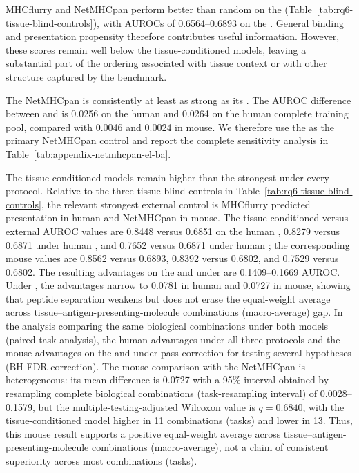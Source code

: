 MHCflurry and NetMHCpan perform better than random on the \plainMatchedPairs{} (Table~\ref{tab:rq6-tissue-blind-controls}), with AUROCs of 0.6564--0.6893 on the \plainFixedTest{}. General binding and presentation propensity therefore contributes useful information. However, these scores remain well below the tissue-conditioned models, leaving a substantial part of the ordering associated with tissue context or with other structure captured by the benchmark.

The NetMHCpan \plainEL{} is consistently at least as strong as its \plainBA{}. The AUROC difference between \plainEL{} and \plainBA{} is 0.0256 on the human \plainFixedTest{} and 0.0264 on the human complete training pool, compared with 0.0046 and 0.0024 in mouse. We therefore use the \plainEL{} as the primary NetMHCpan control and report the complete \plainBA{} sensitivity analysis in Table~\ref{tab:appendix-netmhcpan-el-ba}.

The tissue-conditioned models remain higher than the strongest \plainGeneralPMHC{} under every protocol. Relative to the three tissue-blind controls in Table~\ref{tab:rq6-tissue-blind-controls}, the relevant strongest external control is MHCflurry predicted presentation in human and NetMHCpan \plainEL{} in mouse. The tissue-conditioned-versus-external AUROC values are 0.8448 versus 0.6851 on the human \plainFixedTest{}, 0.8279 versus 0.6871 under human \plainMatchedOOF{}, and 0.7652 versus 0.6871 under human \plainPeptideOOF{}; the corresponding mouse values are 0.8562 versus 0.6893, 0.8392 versus 0.6802, and 0.7529 versus 0.6802. The resulting advantages on the \plainFixedTest{} and under \plainMatchedOOF{} are 0.1409--0.1669 AUROC. Under \plainPeptideOOF{}, the advantages narrow to 0.0781 in human and 0.0727 in mouse, showing that peptide separation weakens but does not erase the equal-weight average across tissue--antigen-presenting-molecule combinations (macro-average) gap. In the analysis comparing the same biological combinations under both models (paired task analysis), the human advantages under all three protocols and the mouse advantages on the \plainFixedTest{} and under \plainMatchedOOF{} pass correction for testing several hypotheses (BH-FDR correction). The mouse \plainPeptideOOF{} comparison with the NetMHCpan \plainEL{} is heterogeneous: its mean difference is 0.0727 with a 95\% interval obtained by resampling complete biological combinations (task-resampling interval) of 0.0028--0.1579, but the multiple-testing-adjusted Wilcoxon value is \(q=0.6840\), with the tissue-conditioned model higher in 11 combinations (tasks) and lower in 13. Thus, this mouse result supports a positive equal-weight average across tissue--antigen-presenting-molecule combinations (macro-average), not a claim of consistent superiority across most combinations (tasks).

